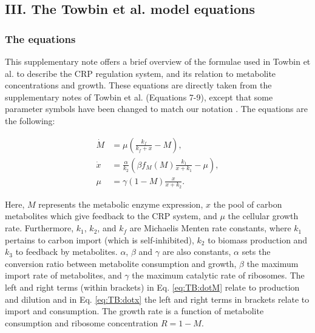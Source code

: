 

\subsection*{III. The Towbin et al. model equations}

\subsubsection*{The equations}

This supplementary note offers a brief overview of the formulae used in Towbin et al. to describe the CRP regulation system, and its relation to metabolite concentrations and growth.
%
These equations are directly taken from the supplementary notes of Towbin et al. (Equations 7-9), except that some parameter symbols have been changed to match our notation \cite{Towbin2017}.
%
The equations are the following:

\begin{align}
	\label{eq:TB:dotM}
	\dot{M} & = \mu ( \frac{k_f}{k_f+x} - M) ,\\
	\label{eq:TB:dotx}
	\dot{x} & = \frac{\alpha}{k_2} \left(    \beta f_M(M) \frac{k_1}{x+k_1}  -    \mu    \right) ,\\
	\label{eq:TB:mu}
	\mu & =\gamma(1-M) \frac{x}{x+k_2}
	.
\end{align}

Here, $M$ represents the metabolic enzyme expression, $x$ the pool of carbon metabolites which give feedback to the CRP system, and $\mu$ the cellular growth rate.
%
Furthermore, $k_1$, $k_2$, and $k_f$ are Michaelis Menten rate constants, where $k_1$ pertains to carbon import (which is self-inhibited), $k_2$ to biomass production and $k_3$ to feedback by metabolites.
%
$\alpha$, $\beta$ and $\gamma$ are also constants, 
$\alpha$ sets the conversion ratio between metabolite consumption and growth,
$\beta$ the maximum import rate of metabolites,
and $\gamma$ the maximum catalytic rate of ribosomes.
%
The left and right terms (within brackets) in Eq. \ref{eq:TB:dotM} relate to production and dilution and in Eq. \ref{eq:TB:dotx} the left and right terms in brackets relate to import and consumption.
%
The growth rate is a function of metabolite consumption and ribosome concentration $R=1-M$.

